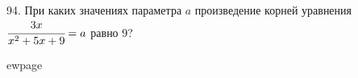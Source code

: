 94. При каких значениях параметра $a$ произведение корней уравнения $\cfrac{3x}{x^2+5x+9}=a$ равно 9?

ewpage
